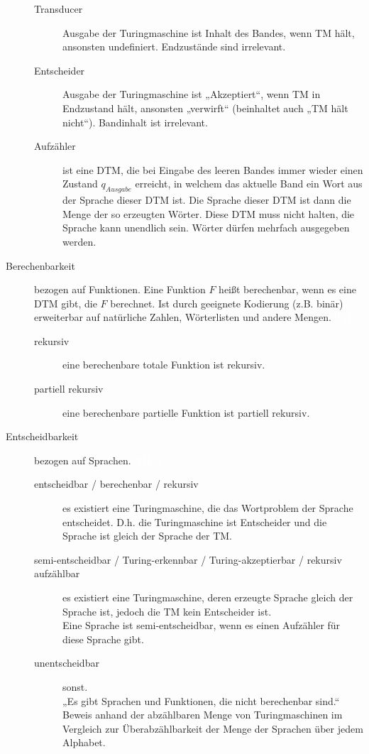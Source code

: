 \documentclass[a4paper,10pt]{article}
\newcommand{\vl}[1]{\colorbox{vl}{\textcolor{white}{\small\textbf{#1}}}}
\begin{document}
\begin{description}
\begin{description}
                \item[Transducer] Ausgabe der Turingmaschine ist Inhalt des Bandes, wenn TM hält, ansonsten undefiniert. Endzustände sind irrelevant.
                \item[Entscheider] Ausgabe der Turingmaschine ist „Akzeptiert“, wenn TM in Endzustand hält, ansonsten „verwirft“ (beinhaltet auch „TM hält nicht“). Bandinhalt ist irrelevant.
                \item[Aufzähler] ist eine DTM, die bei Eingabe des leeren Bandes immer wieder einen Zustand $q_{Ausgabe}$ erreicht, in welchem das aktuelle Band ein Wort aus der Sprache dieser DTM ist. Die Sprache dieser DTM ist dann die Menge der so erzeugten Wörter. Diese DTM muss nicht halten, die Sprache kann unendlich sein. Wörter dürfen mehrfach ausgegeben werden.
            \end{description}

        \item[Berechenbarkeit] bezogen auf Funktionen. Eine Funktion $F$ heißt berechenbar, wenn es eine DTM gibt, die $F$ berechnet. Ist durch geeignete Kodierung (z.B. binär) erweiterbar auf natürliche Zahlen, Wörterlisten und andere Mengen. \vl{TIL 2}
            \begin{description}
                \item[rekursiv] eine berechenbare totale Funktion ist rekursiv.
                \item[partiell rekursiv] eine berechenbare partielle Funktion ist partiell rekursiv.
            \end{description}

        \item[Entscheidbarkeit] bezogen auf Sprachen. \vl{TIL 2}
            \begin{description}
                \item[entscheidbar / berechenbar / rekursiv] es existiert eine Turingmaschine, die das Wortproblem der Sprache entscheidet. D.h. die Turingmaschine ist Entscheider und die Sprache ist gleich der Sprache der TM.
                \item[semi-entscheidbar / Turing-erkennbar / Turing-akzeptierbar / rekursiv aufzählbar] es existiert eine Turingmaschine, deren erzeugte Sprache gleich der Sprache ist, jedoch die TM kein Entscheider ist. \\
                Eine Sprache ist semi-entscheidbar, wenn es einen Aufzähler für diese Sprache gibt.
                \item[unentscheidbar] sonst. \\
                    „Es gibt Sprachen und Funktionen, die nicht berechenbar sind.“ Beweis anhand der abzählbaren Menge von Turingmaschinen im Vergleich zur Überabzählbarkeit der Menge der Sprachen über jedem Alphabet.
            \end{description}


\end{description}
\end{document}
